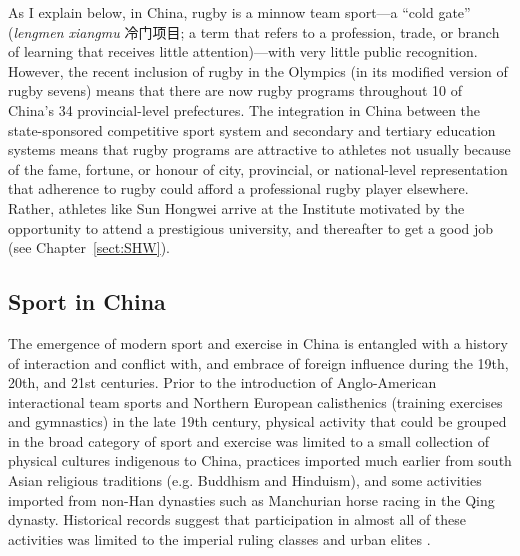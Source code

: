 \begin{CJK}{UTF8}{gbsn}
 As I explain below, in China, rugby is a minnow team sport---a ``cold gate'' (\textit{lengmen xiangmu} 冷门项目; a term that refers to a profession, trade, or branch of learning that receives little attention)---with very little public recognition.  However, the recent inclusion of rugby in the Olympics (in its modified version of rugby sevens) means that there are now rugby programs throughout 10 of China's 34 provincial-level prefectures.  The integration in China between the state-sponsored competitive sport system and secondary and tertiary education systems means that rugby programs are attractive to athletes not usually because of the fame, fortune, or honour of city, provincial, or national-level representation that adherence to rugby could afford a professional rugby player elsewhere. Rather, athletes like Sun Hongwei arrive at the Institute motivated by the opportunity to attend a prestigious university, and thereafter to get a good job (see Chapter~\ref{sect:SHW}).


 \subsection{Sport in China}
 The emergence of modern sport and exercise in China is entangled with a history of interaction and conflict with, and embrace of foreign influence during the 19th, 20th, and 21st centuries.
 Prior to the introduction of Anglo-American interactional team sports and Northern European calisthenics (training exercises and gymnastics) in the late 19th century, physical activity that could be grouped in the broad category of sport and exercise was limited to a small collection of physical cultures indigenous to China, practices imported much earlier from south Asian religious traditions (e.g. Buddhism and Hinduism), and some activities imported from non-Han dynasties such as Manchurian horse racing in the Qing dynasty.  Historical records suggest that participation in almost all of these activities was limited to the imperial ruling classes and urban elites \citep{Ge2005}.


\end{CJK}
